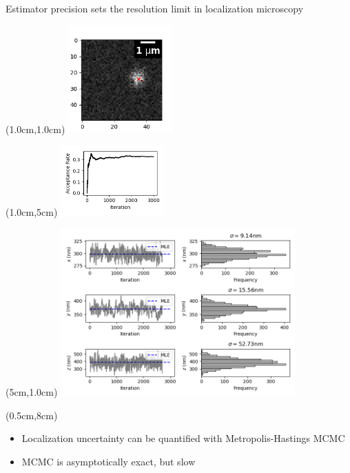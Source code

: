 \documentclass{beamer}					%
\begin{document}
\begin{frame}{Estimator precision sets the resolution limit in localization microscopy}
\begin{textblock*}{4cm}(1.0cm,1.0cm)
\includegraphics[width=4cm]{MCMC/Figure_1.png}
\end{textblock*}
\begin{textblock*}{4cm}(1.0cm,5cm)
\includegraphics[width=4cm]{MCMC/Figure_2.png}
\end{textblock*}
\begin{textblock*}{9cm}(5cm,1.0cm)
\includegraphics[width=9cm]{MCMC/Figure_3.png}
\end{textblock*}
\begin{textblock*}{13cm}(0.5cm,8cm)
\begin{itemize}
\item Localization uncertainty can be quantified with Metropolis-Hastings MCMC
\item MCMC is asymptotically exact, but slow
\end{itemize}
\end{textblock*}
\end{frame}
\end{document}
